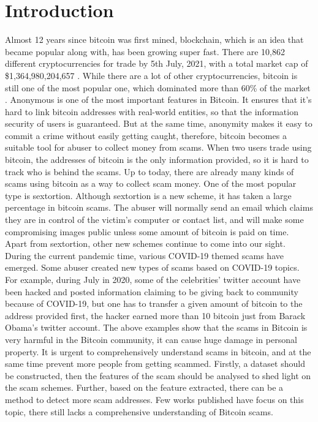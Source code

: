 \section{Introduction}
\label{sec:intro}

Almost 12 years since bitcoin\cite{nakamoto2019bitcoin} was first mined, blockchain, which is an idea that became popular along with, has been growing super fast. There are  10,862 different cryptocurrencies for trade by 5th July, 2021, with a total market cap of \$1,364,980,204,657 \cite{coinmarketcap}. While there are a lot of other cryptocurrencies, bitcoin is still one of the most popular one, which dominated more than 60\% of the market \cite{coinmarketcap}.
Anonymous is one of the most important features in Bitcoin. It ensures that it's hard to link bitcoin addresses with real-world entities, so that the information security of users is guaranteed. But at the same time, anonymity makes it easy to commit a crime without easily getting caught, therefore, bitcoin becomes a suitable tool for abuser to collect money from scams. When two users trade using bitcoin, the addresses of bitcoin is the only information provided, so it is hard to track who is behind the scams. Up to today, there are already many kinds of scams using bitcoin as a way to collect scam money. One of the most popular type is sextortion. Although sextortion is a new scheme, it has taken a large percentage in bitcoin scams. The abuser will normally send an email which claims they are in control of the victim's computer or contact list, and will make some compromising images public unless some amount of bitcoin is paid on time\cite{paquet2019spams}. Apart from sextortion, other new schemes continue to come into our sight. During the current pandemic time, various COVID-19 themed scams have emerged. Some abuser created new types of scams based on COVID-19 topics. For example, during July in 2020, some of the celebrities' twitter account have been hacked and posted information claiming to be giving back to community because of COVID-19, but one has to transfer a given amount of bitcoin to the address provided first, the hacker earned more than 10 bitcoin just from Barack Obama's twitter account\cite{barackobamascam}. 
The above examples show that the scams in Bitcoin is very harmful in the Bitcoin community, it can cause huge damage in personal property. It is urgent to comprehensively understand scams in bitcoin, and at the same time prevent more people from getting scammed. Firstly, a dataset should be constructed, then the features of the scam should be analysed to shed light on the scam schemes. Further, based on the feature extracted, there can be a method to detect more scam addresses. Few works published have focus on this topic, there still lacks a comprehensive understanding of Bitcoin scams.


